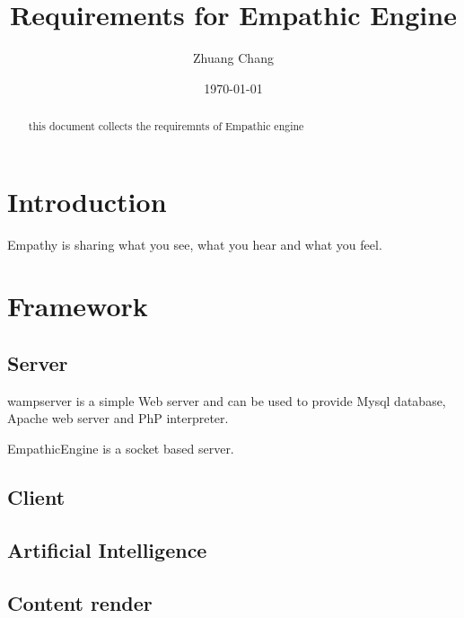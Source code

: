 \documentclass{article}
\begin{document}
\title{Requirements for Empathic Engine}
\author{Zhuang Chang}
\date{\today}
\maketitle
\begin{abstract}
this document collects the requiremnts of Empathic engine

\end{abstract}
\tableofcontents

\section{Introduction}
Empathy is sharing what you see, what you hear and what you
feel.
\section{Framework}
\subsection{Server}
wampserver is a simple Web server and can be used
to provide Mysql database, Apache web server and PhP
interpreter.

EmpathicEngine is a socket based server.
\subsection{Client}

\subsection{Artificial Intelligence}

\subsection{Content render}
\end{document}
